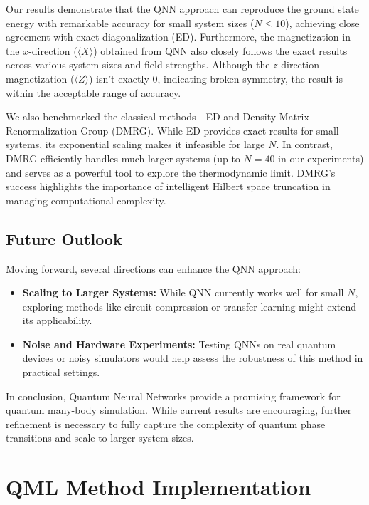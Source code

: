 \documentclass[pre,twocolumn,floatfix]{revtex4-1}
\begin{document}
Our results demonstrate that the QNN approach can reproduce the ground state energy with remarkable accuracy for small system sizes ($N \leq 10$), achieving close agreement with exact diagonalization (ED). Furthermore, the magnetization in the $x$-direction ($\langle X \rangle$) obtained from QNN also closely follows the exact results across various system sizes and field strengths. Although the $z$-direction magnetization ($\langle Z \rangle$) isn't exactly 0, indicating broken symmetry, the result is within the acceptable range of accuracy. 

We also benchmarked the classical methods—ED and Density Matrix Renormalization Group (DMRG). While ED provides exact results for small systems, its exponential scaling makes it infeasible for large $N$. In contrast, DMRG efficiently handles much larger systems (up to $N=40$ in our experiments) and serves as a powerful tool to explore the thermodynamic limit. DMRG's success highlights the importance of intelligent Hilbert space truncation in managing computational complexity.

\subsection{Future Outlook}
Moving forward, several directions can enhance the QNN approach:

\begin{itemize}
    \item \textbf{Scaling to Larger Systems:} While QNN currently works well for small $N$, exploring methods like circuit compression or transfer learning might extend its applicability.
    \item \textbf{Noise and Hardware Experiments:} Testing QNNs on real quantum devices or noisy simulators would help assess the robustness of this method in practical settings.
\end{itemize}

In conclusion, Quantum Neural Networks provide a promising framework for quantum many-body simulation. While current results are encouraging, further refinement is necessary to fully capture the complexity of quantum phase transitions and scale to larger system sizes.


\appendix
\section{QML Method Implementation}
\end{document}

